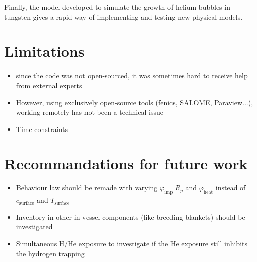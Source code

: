 Finally, the model developed to simulate the growth of helium bubbles in tungsten gives a rapid way of implementing and testing new physical models.

\section*{Limitations}
\begin{itemize}
    \item since the code was not open-sourced, it was sometimes hard to receive help from external experts
    \item However, using exclusively open-source tools (\gls{fenics}, SALOME, Paraview...), working remotely has not been a technical issue
    \item Time constraints
\end{itemize}

\section*{Recommandations for future work}
\begin{itemize}
    \item Behaviour law should be remade with varying $\varphi_\mathrm{imp} \ R_p$ and $\varphi_\mathrm{heat}$ instead of $c_\mathrm{surface}$ and $T_\mathrm{surface}$
    \item Inventory in other in-vessel components (like breeding blankets) should be investigated
    \item Simultaneous H/He exposure to investigate if the He exposure still inhibits the hydrogen trapping
\end{itemize}

